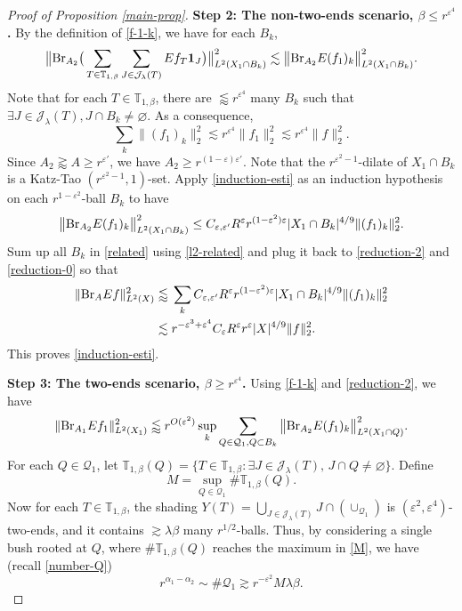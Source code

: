 \documentclass{amsart}
\numberwithin{equation}{section}
\newcommand{\al}{\alpha}
\newcommand{\be}{\beta}
\newcommand{\e}{\varepsilon}
\newcommand{\la}{\lambda}
\newcommand{\cq}{\mathcal Q}
\newcommand{\cj}{\mathcal J}
\newcommand{\ZT}{\mathbb{T}}
\newcommand{\Id}{{\bf 1}}
\newcommand{\BR}{{\rm{Br}}}
\begin{document}
\begin{proof}[Proof of Proposition \ref{main-prop}]
\medskip

{\bf Step 2: The non-two-ends scenario, $\be\leq r^{\e^4}$.}
By the definition of \eqref{f-1-k}, we have for each $B_k$,
\begin{align}
\label{related}
     \big\|\BR_{A_2} \big(\sum_{T\in\ZT_{1,\be}}\sum_{J\in\cj_\la(T)}Ef_{T}\Id_J\big)\big\|_{L^2(X_1\cap B_k)}^2\lesssim \big\|\BR_{A_2}E(f_1)_k\big\|_{L^2(X_1\cap B_k)}^2.
\end{align}
Note that for each $T\in\ZT_{1,\be}$, there are $\lessapprox r^{\e^{4}}$ many $B_k$ such that $\exists J\in\cj_\la(T), J\cap B_k\not=\varnothing$.
As a consequence, 
\begin{equation}
\label{l2-related}
    \sum_{k}\|(f_1)_k\|_2^2\lesssim r^{\e^{4}}\|f_1\|_2^2\lesssim r^{\e^4}\|f\|_2^2. 
\end{equation}
Since $A_2\gtrapprox A\geq r^{\e'}$, we have $A_2\geq r^{(1-\e)\e'}$.
Note that the $r^{\e^2-1}$-dilate of $X_1\cap B_k$ is a Katz-Tao $(r^{\e^2-1},1)$-set.
Apply \eqref{induction-esti} as an induction hypothesis on each $r^{1-\e^2}$-ball $B_k$ to have 
\begin{equation}
    \big\|\BR_{A_2}E(f_1)_k\big\|_{L^2(X_1\cap B_k)}^2\leq C_{\e,\e'} R^{\e}r^{(1-\e^2)\e}|X_1\cap B_k|^{4/9}\|(f_1)_k\|_2^2.
\end{equation}
Sum up all $B_k$ in \eqref{related} using \eqref{l2-related} and plug it back to \eqref{reduction-2} and \eqref{reduction-0} so that
\begin{align}
    \|\BR_A Ef\|_{L^2(X)}^2&\lessapprox \, \sum_{k} C_{\e,\e'} R^{\e}r^{(1-\e^2)\e}|X_1\cap B_k|^{4/9} \|(f_1)_k\|_2^2\\
    &\lesssim  r^{-\e^3+\e^4}C_\e R^\e r^{\e}|X|^{4/9}\|f\|_2^2.
\end{align}
This proves \eqref{induction-esti}.

\medskip

{\bf Step 3: The two-ends scenario, $\be\geq r^{\e^{4}}$.}
Using \eqref{f-1-k} and \eqref{reduction-2}, we have
\begin{equation}
\label{reduction-3}
    \|\BR_{A_1} Ef_1\|_{L^2(X_1)}^2\lessapprox r^{O(\e^2)}\sup_k\sum_{Q\in\cq_1,Q\subset B_k}\big\|\BR_{A_2}E(f_1)_k\big\|_{L^2(X_1\cap Q)}^2.
\end{equation}
For each $Q\in\cq_1$, let $\ZT_{1,\be}(Q)=\{T\in\ZT_{1,\be}:\exists J\in\cj_\la(T),\, J\cap Q\not=\varnothing\}$.
Define
\begin{equation}
\label{M}
    M=\sup_{Q\in\cq_1} \#\ZT_{1,\be}(Q).
\end{equation}
Now for each $T\in\ZT_{1,\be}$, the shading $Y(T)=\bigcup_{J\in\cj_\la(T)}J\cap (\cup_{\cq_1})$ is $(\e^2,\e^4)$-two-ends, and it contains $\gtrsim \la\be$ many $r^{1/2}$-balls.
Thus, by considering a single bush rooted at $Q$, where $\#\ZT_{1,\be}(Q)$ reaches the maximum in \eqref{M}, we have (recall \eqref{number-Q}) 
\begin{equation}
\label{number-Q-lowerbound}
    r^{\al_1-\al_2}\sim\#\cq_1\gtrsim r^{-\e^2}M\la\be.
\end{equation}


\end{proof}
\end{document}
